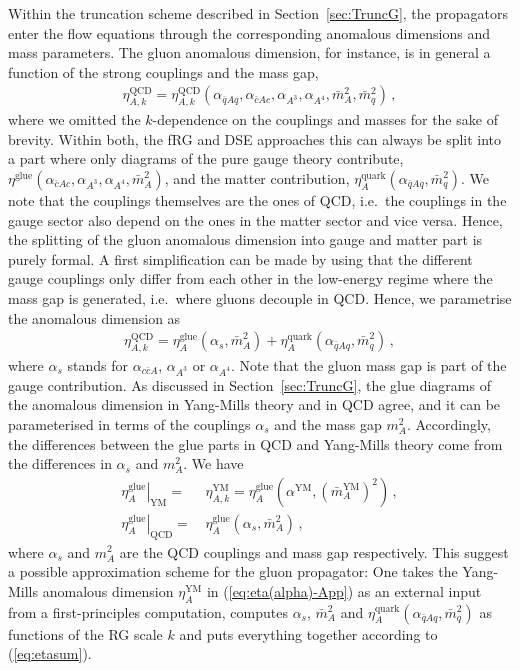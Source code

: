 \documentclass[%
reprint,
superscriptaddress,
showpacs,preprintnumbers,
 amsmath,amssymb,
 aps,
prd,
]{revtex4-1}
\def\eq#1{(\ref{#1})}
\def\sec#1{Section~\ref{#1}}
\begin{document}
Within the truncation scheme described in \sec{sec:TruncG}, the
propagators enter the flow equations through the corresponding
anomalous dimensions and mass parameters. The gluon anomalous
dimension, for instance, is in general a function of the strong
couplings and the mass gap,
%
\begin{align}
  \eta_{A,k}^\text{QCD} = \eta_{A,k}^\text{QCD}(\alpha_{\bar q A q},
  \alpha_{\bar c A c},\alpha_{A^3},\alpha_{A^4}, \bar m_{A}^2, \bar m_{q}^2)\,,
\end{align}
%
where we omitted the $k$-dependence on the couplings and masses for
the sake of brevity. Within both, the fRG and DSE approaches this can
always be split into a part where only diagrams of the pure gauge
theory contribute,
$\eta^\textrm{glue}(\alpha_{\bar c A c},\alpha_{A^3},\alpha_{A^4},
\bar m_{A}^2)$, and the matter contribution,
$\eta^\textrm{quark}_{A}(\alpha_{\bar q A q}, \bar m_{q}^2)$. We note
that the couplings themselves are the ones of QCD, i.e.\ the couplings
in the gauge sector also depend on the ones in the matter sector and
vice versa. Hence, the splitting of the gluon anomalous dimension into
gauge and matter part is purely formal. A first simplification can be
made by using that the different gauge couplings only differ from each
other in the low-energy regime where the mass gap is generated, i.e.\
where gluons decouple in QCD. Hence, we parametrise the anomalous
dimension as
%
\begin{align}\label{eq:etasum}
  \eta_{A,k}^\text{QCD} = \eta^{\textrm{glue}}_{A}(\alpha_s,\bar m_{A}^2) +
  \eta^\textrm{quark}_{A}(\alpha_{\bar q A q}, \bar m_{q}^2)\,,
\end{align}
%
where $\alpha_s$ stands for $\alpha_{c \bar c A }$, $\alpha_{A^3}$ or
$\alpha_{A^4}$. Note that the gluon mass gap is part of the gauge
contribution. As discussed in \sec{sec:TruncG}, the glue diagrams of
the anomalous dimension in Yang-Mills theory and in QCD agree, and it
can be parameterised in terms of the couplings $\alpha_s$ and the mass
gap $m_A^2$. Accordingly, the differences between the glue parts in
QCD and Yang-Mills theory come from the differences in $\alpha_s$ and
$m_A^2$. We have
\begin{align}\nonumber 
  \left.\eta_A^{\textrm{glue}}\right|_{\textrm{YM}}=
  &\,
    \eta_{A,k}^\textrm{YM}= \eta_A^{\textrm{glue}}
    \left(\alpha^{\textrm{YM}},
    (\bar m^{\textrm{YM}}_{A})^2\right)\,, \\[1ex]
  \left.\eta_A^{\textrm{glue}}\right|_{\textrm{QCD}}=
  &\,
    \eta_A^{\textrm{glue}}\left(\alpha_s,
    \bar m_{A}^2\right)\,, 
\label{eq:eta(alpha)-App}\end{align}
%
where $\alpha_s$ and $m_A^2$ are the QCD couplings and mass gap
respectively. This suggest a possible approximation scheme for the
gluon propagator: One takes the Yang-Mills anomalous dimension
$\eta_{A}^\text{YM}$ in \eq{eq:eta(alpha)-App} as an external input
from a first-principles computation, computes $\alpha_s$,
$\bar m_{A}^{2}$ and
$\eta_{A}^\textrm{quark}(\alpha_{\bar q A q}, \bar m_{q}^2)$ as
functions of the RG scale $k$ and puts everything together according
to \eq{eq:etasum}.
\end{document}
